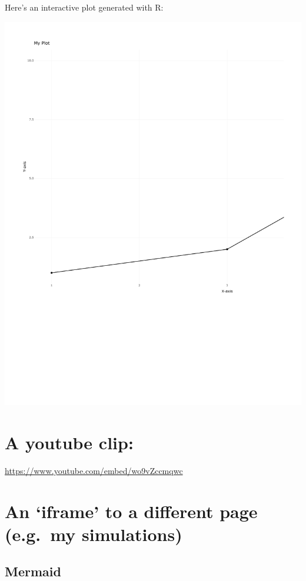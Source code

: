 \documentclass[
  letterpaper,
  DIV=11,
  numbers=noendperiod]{scrreprt}
\theoremstyle{definition}
\theoremstyle{remark}
\begin{document}
Here's an interactive plot generated with R:

\includegraphics{pattern_intro_text_files/figure-pdf/unnamed-chunk-1-1.pdf}

\section{A youtube clip:}\label{a-youtube-clip-1}

\url{https://www.youtube.com/embed/wo9vZccmqwc}

\section{An `iframe' to a different page (e.g.~my
simulations)}\label{an-iframe-to-a-different-page-e.g.-my-simulations-1}

\subsection{Mermaid}\label{mermaid-1}
\end{document}
